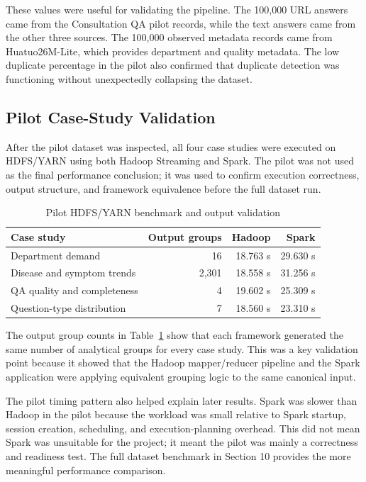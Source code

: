 \documentclass[12pt,a4paper]{article}
\begin{document}
These values were useful for validating the pipeline. The 100,000 URL answers came from the Consultation QA pilot records, while the text answers came from the other three sources. The 100,000 observed metadata records came from Huatuo26M-Lite, which provides department and quality metadata. The low duplicate percentage in the pilot also confirmed that duplicate detection was functioning without unexpectedly collapsing the dataset.

\subsection{Pilot Case-Study Validation}

After the pilot dataset was inspected, all four case studies were executed on HDFS/YARN using both Hadoop Streaming and Spark. The pilot was not used as the final performance conclusion; it was used to confirm execution correctness, output structure, and framework equivalence before the full dataset run.

\begin{table}[H]
\centering
\caption{Pilot HDFS/YARN benchmark and output validation}
\label{tab:pilot-benchmark}
\begin{tabular}{lrrr}
\toprule
Case study & Output groups & Hadoop & Spark \\
\midrule
Department demand & 16 & 18.763 s & 29.630 s \\
Disease and symptom trends & 2,301 & 18.558 s & 31.256 s \\
QA quality and completeness & 4 & 19.602 s & 25.309 s \\
Question-type distribution & 7 & 18.560 s & 23.310 s \\
\bottomrule
\end{tabular}
\end{table}

The output group counts in Table~\ref{tab:pilot-benchmark} show that each framework generated the same number of analytical groups for every case study. This was a key validation point because it showed that the Hadoop mapper/reducer pipeline and the Spark application were applying equivalent grouping logic to the same canonical input.

The pilot timing pattern also helped explain later results. Spark was slower than Hadoop in the pilot because the workload was small relative to Spark startup, session creation, scheduling, and execution-planning overhead. This did not mean Spark was unsuitable for the project; it meant the pilot was mainly a correctness and readiness test. The full dataset benchmark in Section 10 provides the more meaningful performance comparison.
\end{document}
